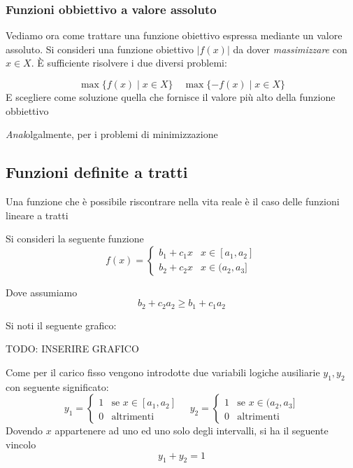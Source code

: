 \subsubsection{Funzioni obbiettivo a valore assoluto}
Vediamo ora come trattare una funzione obiettivo espressa mediante un valore assoluto. Si consideri una funzione obiettivo $|f(x)|$ da dover \textit{massimizzare} con $x\in X$. È sufficiente risolvere i due diversi problemi:

\[
  \max \{f(x)\mid x \in X\} \quad \max \{-f(x)\mid x \in X\}
\]
E scegliere come soluzione quella che fornisce il valore più alto della funzione obbiettivo

\textit{Anal}olgalmente, per i problemi di minimizzazione

\subsection{Funzioni definite a tratti}
Una funzione che è possibile riscontrare nella vita reale è il caso delle funzioni lineare a tratti

Si consideri la seguente funzione 
\begin{equation}
  f(x) = \begin{cases}
    b_1 + c_1x & x \in [a_1, a_2]\\
    b_2+c_2x & x \in (a_2, a_3]
  \end{cases}
\end{equation}

Dove assumiamo 
\[
  b_2 + c_2a_2 \geq b_1 + c_1a_2
\]

Si noti il seguente grafico:

TODO: INSERIRE GRAFICO

Come per il carico fisso vengono introdotte due variabili logiche ausiliarie $ y_1, y_2 $ con seguente significato:
\begin{equation}
  y_1 = \begin{cases}
    1 & \text{se } x \in [a_1, a_2]\\
    0 & \text{altrimenti}
  \end{cases} \quad y_2 = \begin{cases}
    1 & \text{se } x \in (a_2, a_3]\\
    0 & \text{altrimenti}
  \end{cases}
\end{equation}
Dovendo $x$ appartenere ad uno ed uno solo degli intervalli, si ha il seguente vincolo
\[
  y_1 + y_2 = 1
\]


